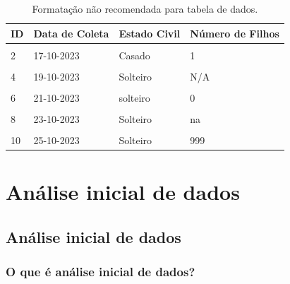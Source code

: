 \documentclass[
  a4paper,
]{book}
\begin{document}
\begin{table}

\caption{\label{tab:tabela-evite}Formatação não recomendada para tabela de dados.}
\centering
\begin{tabu} to 
\toprule
\textbf{ID} & \textbf{Data de Coleta} & \textbf{Estado Civil} & \textbf{Número de Filhos}\\
\midrule
{} &  &  & \\
2 & 17-10-2023 & Casado & 1\\
 &  &  & \\
4 & 19-10-2023 & Solteiro & N/A\\
 &  &  & \\
6 & 21-10-2023 & solteiro & 0\\
 &  &  & \\
8 & 23-10-2023 & Solteiro & na\\
 &  &  & \\
10 & 25-10-2023 & Solteiro & 999\\
\bottomrule
\end{tabu}
\end{table}

\hypertarget{analise-inicial-dados}{%
\chapter{\texorpdfstring{\textbf{Análise inicial de dados}}{Análise inicial de dados}}\label{analise-inicial-dados}}

\hypertarget{analise-inicial}{%
\section{Análise inicial de dados}\label{analise-inicial}}

\hypertarget{o-que-uxe9-anuxe1lise-inicial-de-dados}{%
\subsection{O que é análise inicial de dados?}\label{o-que-uxe9-anuxe1lise-inicial-de-dados}}
\end{document}
